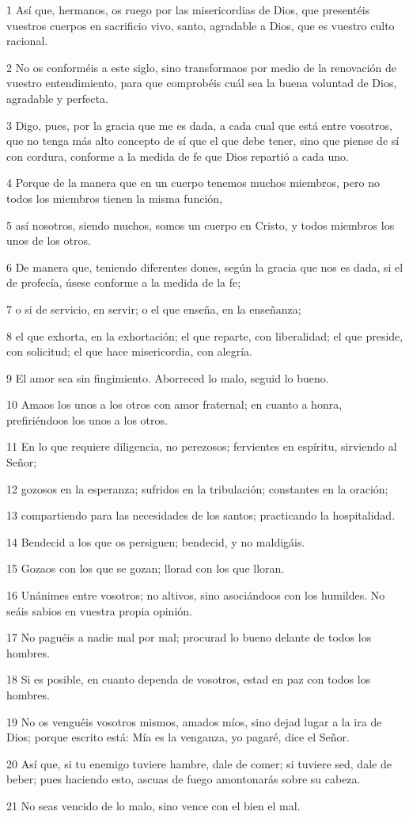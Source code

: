 \par 1 Así que, hermanos, os ruego por las misericordias de Dios, que presentéis vuestros cuerpos en sacrificio vivo, santo, agradable a Dios, que es vuestro culto racional.
\par 2 No os conforméis a este siglo, sino transformaos por medio de la renovación de vuestro entendimiento, para que comprobéis cuál sea la buena voluntad de Dios, agradable y perfecta.
\par 3 Digo, pues, por la gracia que me es dada, a cada cual que está entre vosotros, que no tenga más alto concepto de sí que el que debe tener, sino que piense de sí con cordura, conforme a la medida de fe que Dios repartió a cada uno.
\par 4 Porque de la manera que en un cuerpo tenemos muchos miembros, pero no todos los miembros tienen la misma función,
\par 5 así nosotros, siendo muchos, somos un cuerpo en Cristo, y todos miembros los unos de los otros.
\par 6 De manera que, teniendo diferentes dones, según la gracia que nos es dada, si el de profecía, úsese conforme a la medida de la fe;
\par 7 o si de servicio, en servir; o el que enseña, en la enseñanza;
\par 8 el que exhorta, en la exhortación; el que reparte, con liberalidad; el que preside, con solicitud; el que hace misericordia, con alegría.
\par 9 El amor sea sin fingimiento. Aborreced lo malo, seguid lo bueno.
\par 10 Amaos los unos a los otros con amor fraternal; en cuanto a honra, prefiriéndoos los unos a los otros.
\par 11 En lo que requiere diligencia, no perezosos; fervientes en espíritu, sirviendo al Señor;
\par 12 gozosos en la esperanza; sufridos en la tribulación; constantes en la oración;
\par 13 compartiendo para las necesidades de los santos; practicando la hospitalidad.
\par 14 Bendecid a los que os persiguen; bendecid, y no maldigáis.
\par 15 Gozaos con los que se gozan; llorad con los que lloran.
\par 16 Unánimes entre vosotros; no altivos, sino asociándoos con los humildes. No seáis sabios en vuestra propia opinión.
\par 17 No paguéis a nadie mal por mal; procurad lo bueno delante de todos los hombres.
\par 18 Si es posible, en cuanto dependa de vosotros, estad en paz con todos los hombres.
\par 19 No os venguéis vosotros mismos, amados míos, sino dejad lugar a la ira de Dios; porque escrito está: Mía es la venganza, yo pagaré, dice el Señor.
\par 20 Así que, si tu enemigo tuviere hambre, dale de comer; si tuviere sed, dale de beber; pues haciendo esto, ascuas de fuego amontonarás sobre su cabeza.
\par 21 No seas vencido de lo malo, sino vence con el bien el mal.

